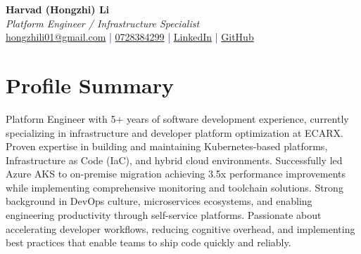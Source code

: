 \documentclass[11pt,a4paper]{article}
\begin{document}
\pagestyle{empty} %

\begin{center}
{\LARGE \textbf{Harvad (Hongzhi) Li}}\\[10pt]
{\Large \textit{Platform Engineer / Infrastructure Specialist}}\\[10pt]
\textcolor{darkblue}{\href{mailto:hongzhili01@google.com}{hongzhili01@gmail.com} | \href{tel:0728384299}{0728384299} | \href{https://www.linkedin.com/in/harvad/}{LinkedIn} | \href{https://github.com/bluehawana}{GitHub}}
\end{center}

\section*{Profile Summary}
Platform Engineer with 5+ years of software development experience, currently specializing in infrastructure and developer platform optimization at ECARX. Proven expertise in building and maintaining Kubernetes-based platforms, Infrastructure as Code (IaC), and hybrid cloud environments. Successfully led Azure AKS to on-premise migration achieving 3.5x performance improvements while implementing comprehensive monitoring and toolchain solutions. Strong background in DevOps culture, microservices ecosystems, and enabling engineering productivity through self-service platforms. Passionate about accelerating developer workflows, reducing cognitive overhead, and implementing best practices that enable teams to ship code quickly and reliably.

\end{document}
